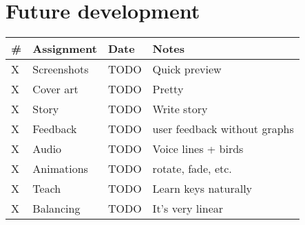 \documentclass[12pt, letterpaper]{article}
\begin{document}
\section{Future development}
\bgroup
\def\arraystretch{1.5}
\begin{tabular}{ R{0.4cm} p{4cm} p{1.5cm} p{5.5cm} }
\toprule
{} & \textbf{Assignment} & \textbf{Date} & \textbf{Notes} \\ 
\midrule

X & Screenshots & TODO & Quick preview \\
X & Cover art & TODO & Pretty \\
X & Story & TODO & Write story \\
X & Feedback & TODO & user feedback without graphs \\
X & Audio & TODO & Voice lines + birds \\
X & Animations & TODO & rotate, fade, etc. \\
X & Teach & TODO & Learn keys naturally \\
X & Balancing & TODO & It's very linear \\

\bottomrule
\end{tabular}
\egroup


\end{document}
